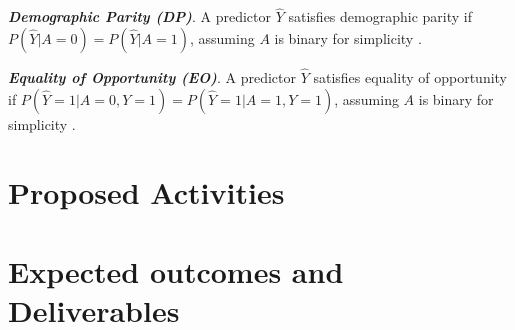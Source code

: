 \documentclass[11pt]{article}
\begin{document}
\textbf{\textit{Demographic Parity (DP)}}. A predictor $\hat{Y}$ satisfies demographic parity if $P(\hat{Y} | A = 0) = P(\hat{Y} | A = 1)$, assuming $A$ is binary for simplicity \cite{kusner2017counterfactual}.

\textbf{\textit{Equality of Opportunity (EO)}}. A predictor $\hat{Y}$ satisfies equality of opportunity if $P(\hat{Y} = 1 | A = 0, Y = 1) = P(\hat{Y} = 1 | A = 1 , Y = 1)$, assuming $A$ is binary for simplicity \cite{kusner2017counterfactual}.

\section{Proposed Activities}

\section{Expected outcomes and Deliverables}
 
 

 
\end{document}
